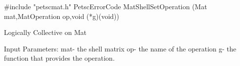 #include "petscmat.h"
PetscErrorCode MatShellSetOperation
   (Mat mat,MatOperation op,void (*g)(void))

Logically Collective on Mat

Input Parameters:
mat- the shell matrix
op- the name of the operation
g- the function that provides the operation.
